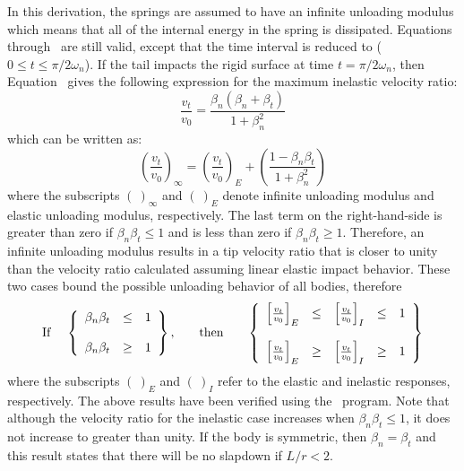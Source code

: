 In this derivation, the springs are assumed to have an infinite
unloading modulus which means that all of the internal energy in the
spring is dissipated.  Equations  through~ are
still valid, except that the time interval is reduced to ($0\leq t\leq
\pi / 2\omega_n$).  If the tail impacts the rigid surface at time
$t=\pi/2\omega_n$, then Equation~ gives the following
expression for the maximum inelastic velocity ratio:
\begin{equation}
\frac{v_t}{v_0} = \frac{\beta_n(\beta_n+\beta_t)}{1+\beta_n^2}
\label{eq:vrv0i}
\end{equation}
which can be written as:
\begin{equation}
\left(\frac{v_t}{v_0}\right)_\infty = \left(\frac{v_t}{v_0}\right)_E +
  \left(\frac{1-\beta_n\beta_t}{1+\beta_n^2}\right)\label{eisum}
\end{equation}
where the subscripts $(\ )_\infty$ and $(\ )_E$ denote infinite
unloading modulus and elastic unloading modulus, respectively.  The
last term on the right-hand-side is greater than zero if
$\beta_n\beta_t\leq1$ and is less than zero if $\beta_n\beta_t\geq1$.
Therefore, an infinite unloading modulus results in a tip velocity
ratio that is closer to unity than the velocity ratio calculated
assuming linear elastic impact behavior.  These two cases bound the
possible unloading behavior of all bodies, therefore
\begin{displaymath}
\begin{array}{cccc}
{\rm If\;} &
   \left\{\begin{array}{rcl}
       \beta_n\beta_t & \leq & 1\\
       {} & {} & {}\\
       \beta_n\beta_t & \geq & 1
   \end{array}\right\}, &
{\quad\rm then\quad} &
   \left\{\begin{array}{rclcl}
       \left[\frac{v_t}{v_0}\right]_E & \leq &
                       \left[\frac{v_t}{v_0}\right]_I & \leq & 1\\
       {} & {} & {} & {} & {}\\
       \left[\frac{v_t}{v_0}\right]_E & \geq &
                       \left[\frac{v_t}{v_0}\right]_I & \geq & 1
   \end{array}\right\}
\end{array}
\end{displaymath}
where the subscripts $(\ )_E$ and $(\ )_I$ refer to the elastic and
inelastic responses, respectively. The above results have been verified
using the \SLAP\ program. Note that although the velocity
ratio for the inelastic case increases when $\beta_n\beta_t \leq  1$, it
does not increase to greater than unity.  If the body is symmetric,
then $\beta_n = \beta_t$ and this result states that there will be no
slapdown if $L/r < 2$.

